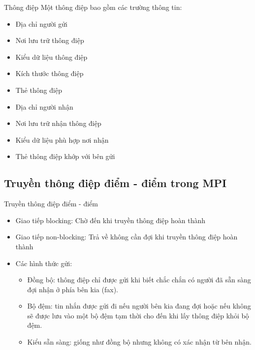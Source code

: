 \documentclass[10pt]{beamer}
\theoremstyle{remark}
\numberwithin{algocf}{section}
\numberwithin{equation}{section}
\numberwithin{dl}{section}
\numberwithin{figure}{section}
\begin{document}
\begin{frame}{Thông điệp}
    Một thông điệp bao gồm các trường thông tin:
    \begin{itemize}
        \item Địa chỉ người gửi
        \item Nơi lưu trữ thông điệp
        \item Kiểu dữ liệu thông điệp
        \item Kích thước thông điệp
        \item Thẻ thông điệp
        \item Địa chỉ người nhận 
        \item Nơi lưu trữ nhận thông điệp
        \item Kiểu dữ liệu phù hợp nơi nhận 
        \item Thẻ thông điệp khớp với bên gửi
    \end{itemize}
\end{frame}

\subsection{Truyền thông điệp điểm - điểm trong MPI}

\begin{frame}{Truyền thông điệp điểm - điểm}
    \begin{itemize}
        \item Giao tiếp blocking: Chờ đến khi truyền thông điệp hoàn thành
        \item Giao tiếp non-blocking: Trả về không cần đợi khi truyền thông điệp hoàn thành
        \item Các hình thức gửi:
        \begin{itemize}
            \item Đồng bộ: thông điệp chỉ được gửi khi biết chắc chắn có người đã sẵn sàng đợi nhận ở phía bên kia (fax).
            \item Bộ đệm: tin nhắn được gửi đi nếu người bên kia đang đợi hoặc nếu không sẽ được lưu vào một bộ đệm tạm thời cho đến khi lấy thông điệp khỏi bộ đệm.
            \item Kiểu sẵn sàng: giống như đồng bộ nhưng không có xác nhận từ bên nhận.
        \end{itemize}
    \end{itemize}
\end{frame}
\end{document}
